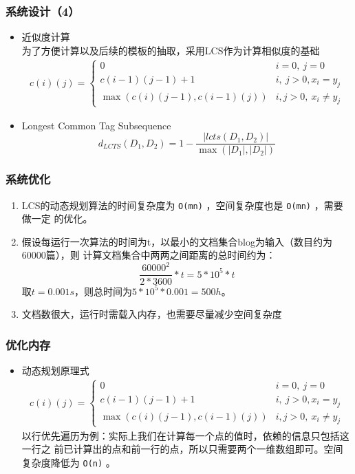 \documentclass[11pt,presentation]{beamer}
\begin{document}
\begin{frame}
\frametitle{系统设计（4）}
\label{sec-2-6}
\begin{itemize}

\item 近似度计算\\
\label{sec-2-6-1}%
为了方便计算以及后续的模板的抽取，采用LCS作为计算相似度的基础
\begin{eqnarray*}
  c(i)(j) =
  \begin{cases}
    0 & i = 0,\: j = 0\\
    c(i-1)(j-1) + 1 & i,\: j > 0, x_i=y_j\\
    \max(c(i)(j-1), c(i-1)(j)) & i, j > 0,\: x_i \ne y_j
  \end{cases}
\end{eqnarray*}

\item Longest Common Tag Subsequence\\
\label{sec-2-6-2}%
\[
d_{LCTS}(D_1,D_2)=1-\frac{|lcts(D_1,D_2)|}{\max(|D_1|,|D_2|)}
\]

\end{itemize} %
\end{frame}
\begin{frame}
\frametitle{系统优化}
\label{sec-2-7}

\begin{enumerate}
\item LCS的动态规划算法的时间复杂度为 \texttt{O(mn)} ，空间复杂度也是 \texttt{O(mn)} ，需要做一定
   的优化。
\item 假设每运行一次算法的时间为t，以最小的文档集合blog为输入（数目约为60000篇），则
   计算文档集合中两两之间距离的总时间约为：
   \[
   \frac{60000^2}{2 * 3600}*t=5*10^5*t
   \]
   取\(t=0.001s\)，则总时间为\(5*10^5*0.001=500h\)。
\item 文档数很大，运行时需载入内存，也需要尽量减少空间复杂度
\end{enumerate}
\end{frame}
\begin{frame}
\frametitle{优化内存}
\label{sec-2-8}

\begin{itemize}
\item 动态规划原理式
     \begin{eqnarray*}
       c(i)(j) =
       \begin{cases}
         0 & i = 0,\: j = 0\\
         c(i-1)(j-1) + 1 & i,\: j > 0, x_i=y_j\\
         \max(c(i)(j-1), c(i-1)(j)) & i, j > 0,\: x_i \ne y_j
       \end{cases}
     \end{eqnarray*}
     以行优先遍历为例：实际上我们在计算每一个点的值时，依赖的信息只包括这一行之
     前已计算出的点和前一行的点，所以只需要两个一维数组即可。空间复杂度降低为
     \texttt{O(n)} 。
\end{itemize}
\end{frame}
\end{document}
